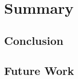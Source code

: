 \section{Summary}\label{sec:timeplan}
\subsection{Conclusion}\label{subsec:conclusion}
\subsection{Future Work}\label{subsec:futurework}




